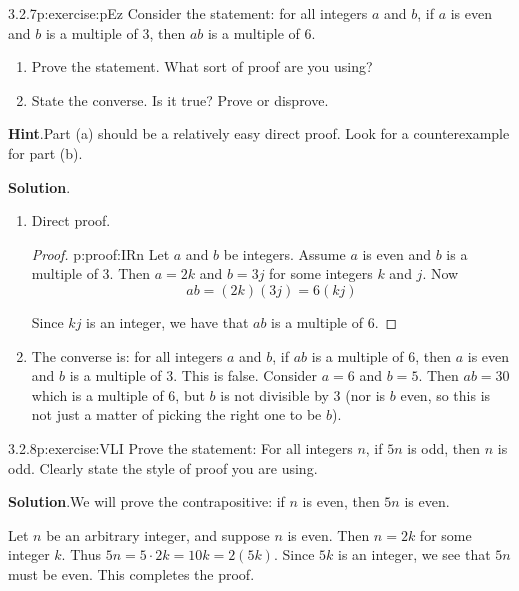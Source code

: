 \documentclass[twoside,11pt,]{book}
\newcommand{\blocktitlefont}{\relax}
\numberwithin{equation}{chapter}
\begin{document}
\begin{divisionsolution}{3.2.7}{}{p:exercise:pEz}%
Consider the statement: for all integers \(a\) and \(b\), if \(a\) is even and \(b\) is a multiple of 3, then \(ab\) is a multiple of 6.%
\begin{enumerate}[label=(\alph*)]
\item{}Prove the statement. What sort of proof are you using?%
\item{}State the converse. Is it true? Prove or disprove.%
\end{enumerate}
%
\par\smallskip%
\noindent\textbf{\blocktitlefont Hint}.\quad{}Part (a) should be a relatively easy direct proof.  Look for a counterexample for part (b).%
\par\smallskip%
\noindent\textbf{\blocktitlefont Solution}.\quad{}%
\begin{enumerate}[label=(\alph*)]
\item{}Direct proof. \begin{proof}{}{p:proof:IRn}
Let \(a\) and \(b\) be integers. Assume \(a\) is even and \(b\) is a multiple of 3. Then \(a = 2k\) and \(b = 3j\) for some integers \(k\) and \(j\). Now%
\begin{equation*}
ab = (2k)(3j) = 6(kj)
\end{equation*}
%
\par
Since \(kj\) is an integer, we have that \(ab\) is a multiple of 6.%
\end{proof}
%
\item{}The converse is: for all integers \(a\) and \(b\), if \(ab\) is a multiple of 6, then \(a\) is even and \(b\) is a multiple of 3. This is false. Consider \(a = 6\) and \(b = 5\). Then \(ab = 30\) which is a multiple of 6, but \(b\) is not divisible by 3 (nor is \(b\) even, so this is not just a matter of picking the right one to be \(b\)).%
\end{enumerate}
\end{divisionsolution}%
\begin{divisionsolution}{3.2.8}{}{p:exercise:VLI}%
Prove the statement: For all integers \(n\), if \(5n\) is odd, then \(n\) is odd. Clearly state the style of proof you are using.%
\par\smallskip%
\noindent\textbf{\blocktitlefont Solution}.\quad{}We will prove the contrapositive: if \(n\) is even, then \(5n\) is even.%
\begin{solutionproof}
Let \(n\) be an arbitrary integer, and suppose \(n\) is even. Then \(n = 2k\) for some integer \(k\). Thus \(5n = 5\cdot 2k = 10k = 2(5k)\). Since \(5k\) is an integer, we see that \(5n\) must be even. This completes the proof.%
\end{solutionproof}
\end{divisionsolution}%
\end{document}

